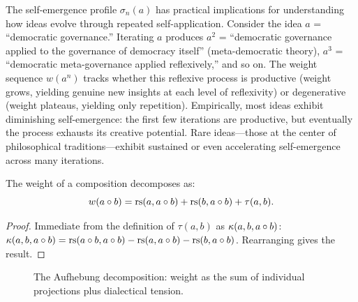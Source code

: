 \begin{remark}\label{rem:ch3:selfcomp_diagnostic}
The self-emergence profile $\sigma_n(a)$ has practical implications for
understanding how ideas evolve through repeated self-application. Consider
the idea $a$ = ``democratic governance.'' Iterating $a$ produces $a^2$ =
``democratic governance applied to the governance of democracy itself''
(meta-democratic theory), $a^3$ = ``democratic meta-governance applied
reflexively,'' and so on. The weight sequence $w(a^n)$ tracks whether
this reflexive process is productive (weight grows, yielding genuine new
insights at each level of reflexivity) or degenerative (weight plateaus,
yielding only repetition). Empirically, most ideas exhibit diminishing
self-emergence: the first few iterations are productive, but eventually
the process exhausts its creative potential. Rare ideas---those at the
center of philosophical traditions---exhibit sustained or even accelerating
self-emergence across many iterations.
\end{remark}

\begin{theorem}\label{thm:aufhebung}
The weight of a composition decomposes as:
\[
    w(a \circ b) = \mathrm{rs}(a, a \circ b) + \mathrm{rs}(b, a \circ b)
    + \tau(a,b).
\]
\end{theorem}
\begin{proof}
Immediate from the definition of $\tau(a,b)$ as $\kappa(a,b,a \circ b)$:
$\kappa(a,b,a\circ b) = \mathrm{rs}(a\circ b, a\circ b) - \mathrm{rs}(a, a\circ b)
- \mathrm{rs}(b, a\circ b)$. Rearranging gives the result.
\end{proof}

\begin{figure}[ht]
\centering
{}
\caption{The Aufhebung decomposition: weight as the sum of individual
projections plus dialectical tension.}
\label{fig:aufhebung}
\end{figure}

